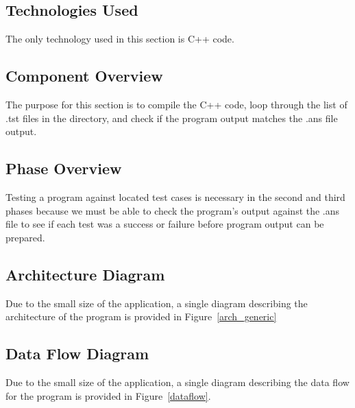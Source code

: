 \subsection{Technologies  Used}
The only technology used in this section is C++ code.

\subsection{Component  Overview}
The purpose for this section is to compile the C++ code, loop through the list of .tst files in the directory, and check if the program output matches the .ans file output.

\subsection{Phase Overview}
Testing a program against located test cases is necessary in the second and third phases because we must be able to check the program's output against the .ans file to see if each test was a success or failure before program output can be prepared.

\subsection{ Architecture  Diagram}
Due to the small size of the application, a single diagram describing the architecture of the program is provided in Figure~\ref{arch_generic}

\subsection{Data Flow Diagram}
Due to the small size of the application, a single diagram describing the data flow for the program is provided in Figure~\ref{dataflow}.


